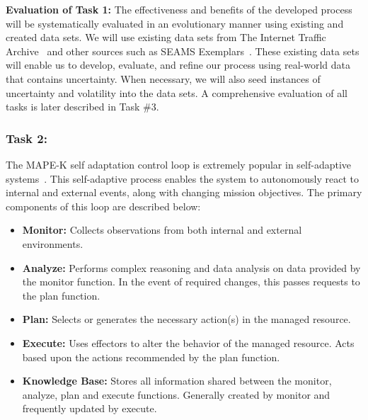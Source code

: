 \documentclass[12pt]{article}
\begin{document}
\vspace{1mm} \noindent \textbf{Evaluation of Task 1: }The effectiveness and benefits of the developed process will be systematically evaluated in an evolutionary manner using existing and created data sets. We will use existing data sets from The Internet Traffic Archive~\cite{InternetTrafficArchive_URL} and other sources such as SEAMS Exemplars~\cite{SEAMS_Exemplars_URL}. These existing data sets will enable us to develop, evaluate, and refine our process using real-world data that contains uncertainty. When necessary, we will also seed instances of uncertainty and volatility into the data sets. A comprehensive evaluation of all tasks is later described in Task \#3.


\subsubsection{Task 2: \TB} \vspace{-2mm} 


The MAPE-K self adaptation control loop is extremely popular in self-adaptive systems~\cite{kephart2003vision, Iglesia:2015:MFT:2819320.2724719}. This self-adaptive process enables the system to autonomously react to internal and external events, along with changing mission objectives. The primary components of this loop are described below:

\begin{itemize}[noitemsep]
    \item \textbf{Monitor: }Collects observations from both internal and external environments. 
    \item \textbf{Analyze: }Performs complex reasoning and data analysis on data provided by the monitor function. In the event of required changes, this passes requests to the plan function.
    \item \textbf{Plan: }Selects or generates the necessary action(s) in the managed resource.
    \item \textbf{Execute: }Uses effectors to alter the behavior of the managed resource. Acts based upon the actions recommended by the plan function.
    \item \textbf{Knowledge Base: }Stores all information shared between the monitor, analyze, plan and execute functions. Generally created by monitor and frequently updated by execute. 
\end{itemize}
\end{document}
